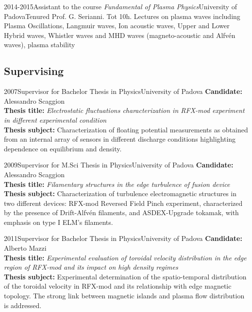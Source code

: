 {\begin{entrylist}
\entry
{2014-2015}{Assistant to the course \emph{Fundamental of Plasma
    Physics}}{University of Padova}{Tenured Prof. G. Serianni. Tot
  10h. Lectures on plasma waves including Plasma Oscillations,
  Langmuir waves,  Ion acoustic waves,  Upper and Lower Hybrid waves,
Whistler waves and MHD waves (magneto-acoustic and Alfv\'en waves),
plasma stability}

\end{entrylist}

\subsection*{Supervising}
\begin{entrylist}
\entry
{2007}{Supervisor for Bachelor Thesis in Physics}{University of
  Padova}
{ \textbf{Candidate:} Alessandro Scaggion \\
\textbf{Thesis title:} \emph{Electrostatic fluctuations characterization in
   RFX-mod experiment in different experimental condition} \\
\textbf{Thesis subject:} Characterization of floating potential
 measurements as obtained from an internal array of sensors in
 different discharge conditions highlighting dependence on
 equilibrium and density. 
}

\entry
{2009}{Supervisor for M.Sci Thesis in Physics}{University of
  Padova}
{ \textbf{Candidate:} Alessandro Scaggion \\
\textbf{Thesis title:} \emph{Filamentary structures in the edge
  turbulence of fusion device} \\
\textbf{Thesis subject:} Characterization of turbulence
electromagnetic structures in two different devices: RFX-mod Reversed
Field Pinch experiment, characterized by the presence of
Drift-Alfv\'en filaments, and ASDEX-Upgrade tokamak, with emphasis on
type I ELM's filaments.
}

\entry
{2011}{Supervisor for Bachelor Thesis in Physics}{University of
  Padova}
{ \textbf{Candidate:} Alberto Mazzi \\
\textbf{Thesis title:} \emph{Experimental evaluation of toroidal
   velocity distribution in the edge region of RFX-mod and its impact
   on high density regimes} \\
\textbf{Thesis subject:} Experimental determination of the
 spatio-temporal distribution of the toroidal
 velocity  in RFX-mod and its relationship with edge magnetic
 topology. The strong link between magnetic islands and
 plasma flow distribution is addressed.
}


\end{entrylist}}
